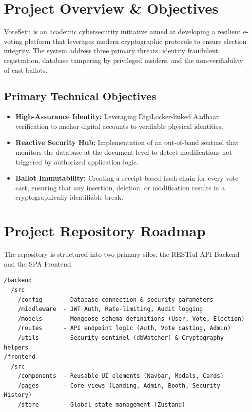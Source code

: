 \documentclass[11pt,a4paper]{article}
\begin{document}
\newpage
\tableofcontents
\newpage

\section{Project Overview \& Objectives}
VoteSetu is an academic cybersecurity initiative aimed at developing a resilient e-voting platform that leverages modern cryptographic protocols to ensure election integrity. The system address three primary threats: identity fraudulent registration, database tampering by privileged insiders, and the non-verifiability of cast ballots.

\subsection{Primary Technical Objectives}
\begin{itemize}[label=\textcolor{secondary}{\textbullet}]
    \item \textbf{High-Assurance Identity:} Leveraging DigiLocker-linked Aadhaar verification to anchor digital accounts to verifiable physical identities.
    \item \textbf{Reactive Security Hub:} Implementation of an out-of-band sentinel that monitors the database at the document level to detect modifications not triggered by authorized application logic.
    \item \textbf{Ballot Immutability:} Creating a receipt-based hash chain for every vote cast, ensuring that any insertion, deletion, or modification results in a cryptographically identifiable break.
\end{itemize}

\section{Project Repository Roadmap}
The repository is structured into two primary silos: the RESTful API Backend and the SPA Frontend.

\begin{tcolorbox}[colframe=secondary, colback=white, title=Directory Architecture]
\small
\begin{verbatim}
/backend
  /src
    /config      - Database connection & security parameters
    /middleware  - JWT Auth, Rate-limiting, Audit logging
    /models      - Mongoose schema definitions (User, Vote, Election)
    /routes      - API endpoint logic (Auth, Vote casting, Admin)
    /utils       - Security sentinel (dbWatcher) & Cryptography helpers
/frontend
  /src
    /components  - Reusable UI elements (Navbar, Modals, Cards)
    /pages       - Core views (Landing, Admin, Booth, Security History)
    /store       - Global state management (Zustand)
\end{verbatim}
\end{tcolorbox}
\end{document}
